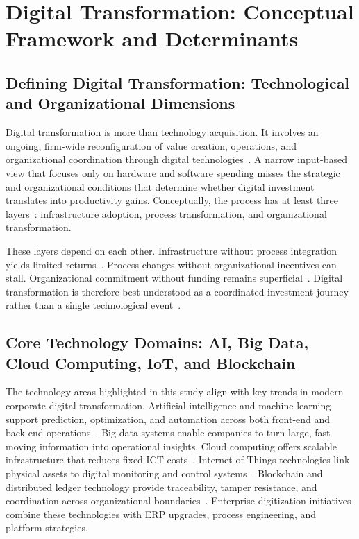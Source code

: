 \section{Digital Transformation: Conceptual Framework and Determinants}

\subsection{Defining Digital Transformation: Technological and Organizational Dimensions}

Digital transformation is more than technology acquisition. It involves an ongoing, firm-wide reconfiguration of value creation, operations, and organizational coordination through digital technologies~\cite{Yang2023}. A narrow input-based view that focuses only on hardware and software spending misses the strategic and organizational conditions that determine whether digital investment translates into productivity gains. Conceptually, the process has at least three layers~\cite{Verhoef2021,XueZhang2024}: infrastructure adoption, process transformation, and organizational transformation.

These layers depend on each other. Infrastructure without process integration yields limited returns~\cite{WangLi2024}. Process changes without organizational incentives can stall. Organizational commitment without funding remains superficial~\cite{XueZhang2024}. Digital transformation is therefore best understood as a coordinated investment journey rather than a single technological event~\cite{Chanias2019}.

\subsection{Core Technology Domains: AI, Big Data, Cloud Computing, IoT, and Blockchain}

The technology areas highlighted in this study align with key trends in modern corporate digital transformation. Artificial intelligence and machine learning support prediction, optimization, and automation across both front-end and back-end operations~\cite{Babina2024}. Big data systems enable companies to turn large, fast-moving information into operational insights. Cloud computing offers scalable infrastructure that reduces fixed ICT costs~\cite{Adeola2020}. Internet of Things technologies link physical assets to digital monitoring and control systems~\cite{Kommisetty2022}. Blockchain and distributed ledger technology provide traceability, tamper resistance, and coordination across organizational boundaries~\cite{Ansari2025}. Enterprise digitization initiatives combine these technologies with ERP upgrades, process engineering, and platform strategies.

